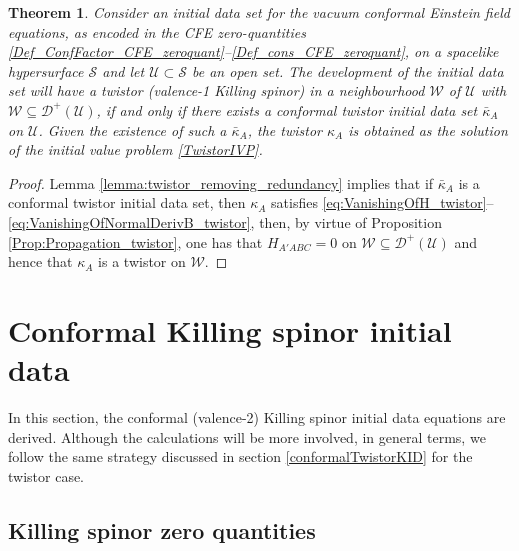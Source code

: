 \documentclass[10pt,a4paper]{article}
\theoremstyle{plain}
\newtheorem{theorem}{Theorem}
\begin{document}
\begin{theorem}\label{Theorem_twistor}
Consider an initial data set for the vacuum conformal Einstein field
equations, as encoded in the CFE zero-quantities
\eqref{Def_ConfFactor_CFE_zeroquant}--\eqref{Def_cons_CFE_zeroquant},
on a spacelike hypersurface $\mathcal{S}$ and let
$\mathcal{U}\subset\mathcal{S}$ be an open set.  The development of
the initial data set will have a twistor (valence-1 Killing spinor) in
a neighbourhood $\mathcal{W}$ of $\mathcal{U}$
with $\mathcal{W}\subseteq \mathcal{D}^{+}(\mathcal{U})$,
if and only if there exists
a conformal twistor initial data set $\bar{\kappa}_A$ on
$\mathcal{U}$.  Given the existence of such a $\bar{\kappa}_A$, the
twistor $\kappa_A$ is obtained as the solution of the initial value
problem \eqref{TwistorIVP}.
\end{theorem}
\begin{proof}
  Lemma \ref{lemma:twistor_removing_redundancy} implies that if
  $\bar{\kappa}_A$ is a conformal twistor initial data set, then
  $\kappa_A$ satisfies
  \eqref{eq:VanishingOfH_twistor}--\eqref{eq:VanishingOfNormalDerivB_twistor},
  then, by virtue of Proposition \ref{Prop:Propagation_twistor}, one has that
  $H_{A'ABC}=0$ on $\mathcal{W}\subseteq
  \mathcal{D}^{+}(\mathcal{U})$ and hence that
  $\kappa_A$ is a twistor on $\mathcal{W}$.
\end{proof}

  
\section{Conformal Killing spinor initial data}
  \label{conformalKSKID}

In this section, the conformal (valence-2) Killing spinor initial data
equations are derived.  Although the calculations will be more
involved, in general terms, we follow the same strategy discussed in
section \ref{conformalTwistorKID} for the twistor case.

\subsection{Killing spinor zero quantities}
\end{document}
